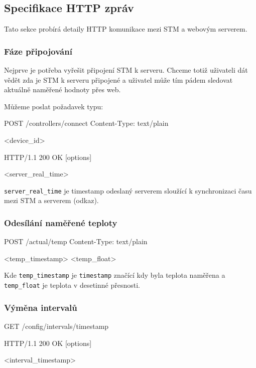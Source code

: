 \subsection{Specifikace HTTP zpráv}

Tato sekce probírá detaily HTTP komunikace mezi STM a webovým serverem.

\subsubsection{Fáze připojování}
Nejprve je potřeba vyřešit připojení STM k serveru.
Chceme totiž uživateli dát vědět zda je STM k serveru připojené a uživatel může tím pádem
sledovat aktuálně naměřené hodnoty přes web.

Můžeme poslat požadavek typu:
\begin{packetstm}
POST /controllers/connect
Content-Type: text/plain

<device_id>
\end{packetstm}

\begin{packetserver}
HTTP/1.1 200 OK
[options]

<server_real_time>
\end{packetserver}

\texttt{server\_real\_time} je timestamp odeslaný serverem sloužící k synchronizaci času
mezi STM a serverem (odkaz).

\subsubsection{Odesílání naměřené teploty}
\begin{packetstm}
POST /actual/temp
Content-Type: text/plain

<temp_timestamp>
<temp_float>
\end{packetstm}

Kde \texttt{temp\_timestamp} je \texttt{timestamp} značící kdy byla teplota naměřena a
\texttt{temp\_float} je teplota v desetinné přesnosti.

\subsubsection{Výměna intervalů}
\begin{packetstm}
GET /config/intervals/timestamp
\end{packetstm}

\begin{packetserver}
HTTP/1.1 200 OK
[options]

<interval_timestamp>
\end{packetserver}

